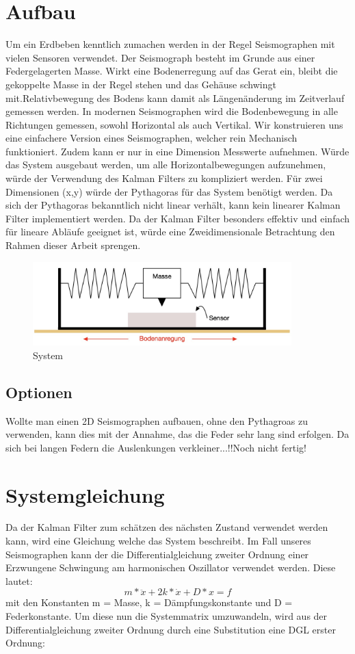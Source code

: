 \documentclass[11pt,a4paper]{article}
\begin{document}
\section{Aufbau}
Um ein Erdbeben kenntlich zumachen werden in der Regel Seismographen mit vielen Sensoren verwendet. 
Der Seismograph besteht im Grunde aus einer Federgelagerten Masse. Wirkt eine Bodenerregung auf das Gerat ein, bleibt die gekoppelte Masse in der Regel stehen und das Gehäuse schwingt mit.Relativbewegung des Bodens kann damit als Längenänderung im Zeitverlauf gemessen werden. In modernen Seismographen wird die Bodenbewegung in alle Richtungen gemessen, sowohl Horizontal als auch Vertikal. 
Wir konstruieren uns eine einfachere Version eines Seismographen, welcher rein Mechanisch funktioniert. Zudem kann er nur in eine Dimension Messwerte aufnehmen. Würde das System ausgebaut werden, um alle Horizontalbewegungen aufzunehmen, würde der Verwendung des Kalman Filters zu kompliziert werden. Für zwei Dimensionen (x,y) würde der Pythagoras für das System benötigt werden. Da sich der Pythagoras bekanntlich nicht linear verhält, kann kein linearer Kalman Filter implementiert werden. Da der Kalman Filter besonders effektiv und einfach für lineare Abläufe geeignet ist, würde eine Zweidimensionale Betrachtung den Rahmen dieser Arbeit sprengen. 
\begin{figure}[h]
 \begin{center}
 \includegraphics[width=10cm]{Apperatur}
 \caption{System}
 \end{center}
\end{figure}


\subsection{Optionen}
Wollte man einen 2D Seismographen aufbauen, ohne den Pythagroas zu verwenden, kann dies mit der Annahme, das die Feder sehr lang sind erfolgen. Da sich bei langen Federn die Auslenkungen verkleiner...!!Noch nicht fertig!

\section{Systemgleichung}
Da der Kalman Filter zum schätzen des nächsten Zustand verwendet werden kann, wird eine Gleichung welche das System beschreibt. Im Fall unseres Seismographen kann der die Differentialgleichung zweiter Ordnung einer Erzwungene Schwingung am harmonischen Oszillator verwendet werden. Diese lautet:
\begin{equation}
m* \ddot x + 2k *\dot x + D*x = f
\end{equation}
mit den Konstanten m = Masse, k = Dämpfungskonstante und D  = Federkonstante.
Um diese nun die Systemmatrix umzuwandeln, wird aus der Differentialgleichung zweiter Ordnung durch eine Substitution eine DGL erster Ordnung:
\end{document}

